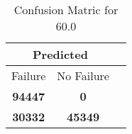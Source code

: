 \begin{table}[] 
\caption{Confusion Matric for 60.0} 
\label{Table: Prediction Accuracy-DMD60.0OnlySunEKF-ignoreReflectionperfectNoFailurePrediction-Reflection} 
\centering 
\begin{tabular} 
 {@{}ccc@{}} 
\toprule 
\multicolumn{2}{c}{\textbf{Predicted}}
 \\ \midrule 
\multicolumn{1}{|c|}{Failure} & 
\multicolumn{1}{c|}{No Failure}
 \\ \midrule 
\multicolumn{1}{|c|}{\color{green}\textbf{94447}} & 
\multicolumn{1}{c|}{\color{red}\textbf{0}}
 \\ \midrule 
\multicolumn{1}{|c|}{\color{red}\textbf{30332}} & 
\multicolumn{1}{c|}{\color{green}\textbf{45349}}
 \\ \bottomrule 
\end{tabular} 
\end{table} 
